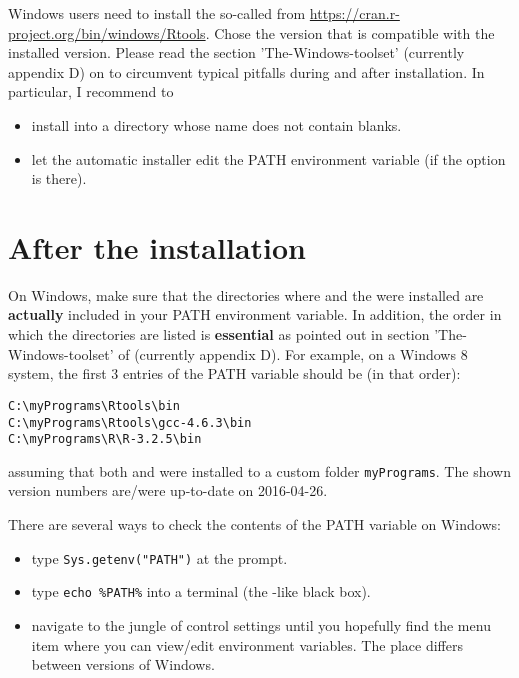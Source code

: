 \documentclass[10pt,a4paper]{article}
\begin{document}
Windows users need to install the so-called  from \url{https://cran.r-project.org/bin/windows/Rtools}. Chose the version that is compatible with the installed  version. Please read the section 'The-Windows-toolset' (currently appendix D) on \radmin{} to circumvent typical pitfalls during and after installation. In particular, I recommend to
\begin{itemize}
  \item install into a directory whose name does not contain blanks.
  \item let the automatic installer edit the PATH environment variable (if the option is there). 
\end{itemize}

\section{After the installation} \label{sec:postInstall}

On Windows, make sure that the directories where  and the   were installed are \textbf{actually} included in your PATH environment variable. In addition, the order in which the directories are listed is \textbf{essential} as pointed out in section 'The-Windows-toolset' of \radmin{} (currently appendix D). For example, on a Windows 8 system, the first 3 entries of the PATH variable should be (in that order):

\begin{verbatim}
C:\myPrograms\Rtools\bin
C:\myPrograms\Rtools\gcc-4.6.3\bin
C:\myPrograms\R\R-3.2.5\bin
\end{verbatim}

\noindent assuming that both  and  were installed to a custom folder \verb|myPrograms|. The shown version numbers are/were up-to-date on 2016-04-26.

There are several ways to check the contents of the PATH variable on Windows:

\begin{itemize}
  \item type \verb|Sys.getenv("PATH")| at the  prompt.
  \item type \verb|echo %PATH%| into a  terminal (the -like black box).
  \item navigate to the jungle of control settings until you hopefully find the menu item where you can view/edit environment variables. The place differs between versions of Windows.
\end{itemize}
\end{document}
